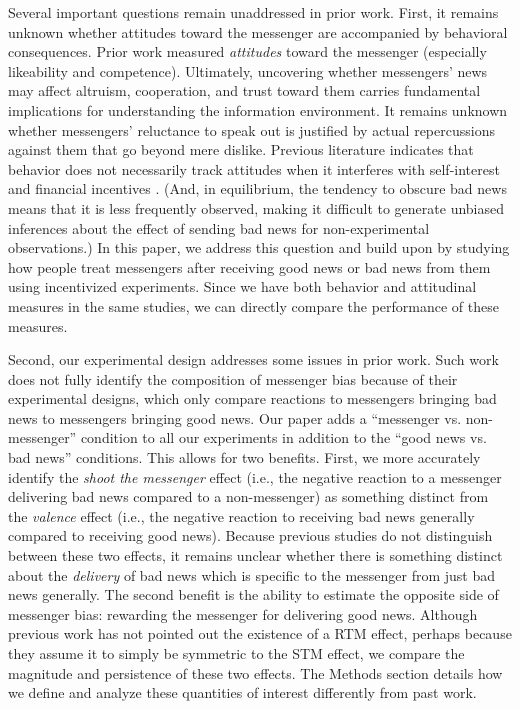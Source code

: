 Several important questions remain unaddressed in prior work. First, it
remains unknown whether attitudes toward the messenger are accompanied
by behavioral consequences. Prior work measured
\emph{attitudes} toward the messenger (especially
likeability and competence). Ultimately, uncovering whether messengers'
news may affect altruism, cooperation, and trust toward them carries
fundamental implications for understanding the information environment.
It remains unknown whether messengers' reluctance to speak out is
justified by actual repercussions against them that go beyond mere
dislike. Previous literature indicates that behavior does not
necessarily track attitudes when it interferes with self-interest and
financial incentives \citep{crano2006attitudes,lehman2002pervasive}.
(And, in equilibrium, the tendency to obscure bad news means that it is
less frequently observed, making it difficult to generate unbiased
inferences about the effect of sending bad news for non-experimental
observations.) In this paper, we address this question and build upon
\citet{john2019shooting} by studying how people treat messengers after
receiving good news or bad news from them using incentivized
experiments. Since we have both behavior and attitudinal measures in the
same studies, we can directly compare the performance of these measures.

Second, our experimental design addresses some issues in prior work.
Such work does not fully identify the composition of messenger bias
because of their experimental designs, which only compare reactions to
messengers bringing bad news to messengers bringing good news. Our paper
adds a ``messenger vs. non-messenger'' condition to all our
experiments in addition to the ``good news vs. bad news'' conditions.
This allows for two benefits. First, we more accurately identify the
\emph{shoot the messenger} effect (i.e., the negative reaction to a
messenger delivering bad news compared to a non-messenger) as something
distinct from the \emph{valence} effect (i.e., the negative reaction to
receiving bad news generally compared to receiving good news). Because
previous studies do not distinguish between these two effects, it
remains unclear whether there is something distinct about the
\emph{delivery} of bad news which is specific to the messenger from just
bad news generally. The second benefit is the ability to estimate the
opposite side of messenger bias: rewarding the messenger for
delivering good news. Although previous work has not pointed out the
existence of a RTM effect, perhaps because they assume it to simply be
symmetric to the STM effect, we compare the magnitude and persistence of
these two effects. The Methods section details how we define and analyze
these quantities of interest differently from past work.

